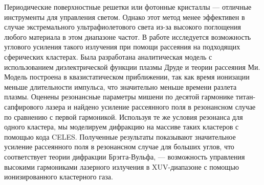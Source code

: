 Периодические поверхностные решетки или фотонные кристаллы — отличные инструменты для управления светом. Однако этот метод менее эффективен в случае экстремального ультрафиолетового света из-за высокого поглощения любого материала в этом диапазоне частот. В работе исследуется возможность углового усиления такого излучения при помощи рассеяния на подходящих сферических кластерах. Была разработана аналитическая модель с использованием диэлектрической функции плазмы Друде и теории рассеяния Ми. Модель построена в квазистатическом приближении, так как время ионизации меньше длительности импульса, что значительно меньше времени разлета плазмы. Оценены резонансные параметры мишени по десятой гармонике титан-сапфирового лазера и найдено усиление рассеянного поля в резонансном случае по сравнению с первой гармоникой. Используя те же условия резонанса для одного кластера, мы моделируем дифракцию на массиве таких кластеров с помощью кода CELES. Полученные результаты показывают значительное усиление рассеянного поля в резонансном случае для больших углов, что соответствует теории дифракции Брэгга-Вульфа, --- возможность управления высокими гармониками лазерного излучения в XUV-диапазоне с помощью ионизированного кластерного газа.